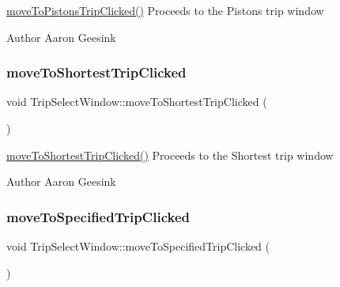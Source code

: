 \mbox{\hyperlink{class_trip_select_window_a42a599fbfb64df27a27a0cf3b44592db}{move\+To\+Pistons\+Trip\+Clicked()}} Proceeds to the Pistons trip window 

\begin{DoxyAuthor}{Author}
Aaron Geesink 
\end{DoxyAuthor}
\mbox{\label{class_trip_select_window_a6381ba254b16b743dbeb0f2f3f491e19}} 
\subsubsection{\texorpdfstring{moveToShortestTripClicked}{moveToShortestTripClicked}}
{\footnotesize\ttfamily void Trip\+Select\+Window\+::move\+To\+Shortest\+Trip\+Clicked (\begin{DoxyParamCaption}{ }\end{DoxyParamCaption})\hspace{0.3cm}{\ttfamily [signal]}}



\mbox{\hyperlink{class_trip_select_window_a6381ba254b16b743dbeb0f2f3f491e19}{move\+To\+Shortest\+Trip\+Clicked()}} Proceeds to the Shortest trip window 

\begin{DoxyAuthor}{Author}
Aaron Geesink 
\end{DoxyAuthor}
\mbox{\label{class_trip_select_window_aee52b96823637577f840e23382ad89c9}} 
\subsubsection{\texorpdfstring{moveToSpecifiedTripClicked}{moveToSpecifiedTripClicked}}
{\footnotesize\ttfamily void Trip\+Select\+Window\+::move\+To\+Specified\+Trip\+Clicked (\begin{DoxyParamCaption}{ }\end{DoxyParamCaption})\hspace{0.3cm}{\ttfamily [signal]}}



